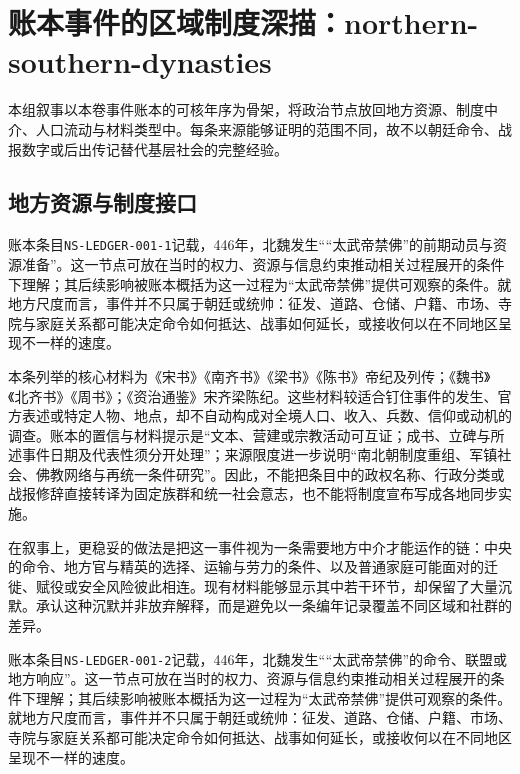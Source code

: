 \section{账本事件的区域制度深描：northern-southern-dynasties}

\label{sec:ledger-depth-northern-southern-dynasties}

本组叙事以本卷事件账本的可核年序为骨架，将政治节点放回地方资源、制度中介、人口流动与材料类型中。每条来源能够证明的范围不同，故不以朝廷命令、战报数字或后出传记替代基层社会的完整经验。

\subsection{地方资源与制度接口}

账本条目\texttt{NS-LEDGER-001-1}记载，446年，北魏发生““太武帝禁佛”的前期动员与资源准备”。这一节点可放在当时的权力、资源与信息约束推动相关过程展开的条件下理解；其后续影响被账本概括为这一过程为“太武帝禁佛”提供可观察的条件。就地方尺度而言，事件并不只属于朝廷或统帅：征发、道路、仓储、户籍、市场、寺院与家庭关系都可能决定命令如何抵达、战事如何延长，或接收何以在不同地区呈现不一样的速度。

本条列举的核心材料为《宋书》《南齐书》《梁书》《陈书》帝纪及列传；《魏书》《北齐书》《周书》；《资治通鉴》宋齐梁陈纪。这些材料较适合钉住事件的发生、官方表述或特定人物、地点，却不自动构成对全境人口、收入、兵数、信仰或动机的调查。账本的置信与材料提示是“文本、营建或宗教活动可互证；成书、立碑与所述事件日期及代表性须分开处理”；来源限度进一步说明“南北朝制度重组、军镇社会、佛教网络与再统一条件研究”。因此，不能把条目中的政权名称、行政分类或战报修辞直接转译为固定族群和统一社会意志，也不能将制度宣布写成各地同步实施。

在叙事上，更稳妥的做法是把这一事件视为一条需要地方中介才能运作的链：中央的命令、地方官与精英的选择、运输与劳力的条件、以及普通家庭可能面对的迁徙、赋役或安全风险彼此相连。现有材料能够显示其中若干环节，却保留了大量沉默。承认这种沉默并非放弃解释，而是避免以一条编年记录覆盖不同区域和社群的差异。

账本条目\texttt{NS-LEDGER-001-2}记载，446年，北魏发生““太武帝禁佛”的命令、联盟或地方响应”。这一节点可放在当时的权力、资源与信息约束推动相关过程展开的条件下理解；其后续影响被账本概括为这一过程为“太武帝禁佛”提供可观察的条件。就地方尺度而言，事件并不只属于朝廷或统帅：征发、道路、仓储、户籍、市场、寺院与家庭关系都可能决定命令如何抵达、战事如何延长，或接收何以在不同地区呈现不一样的速度。

